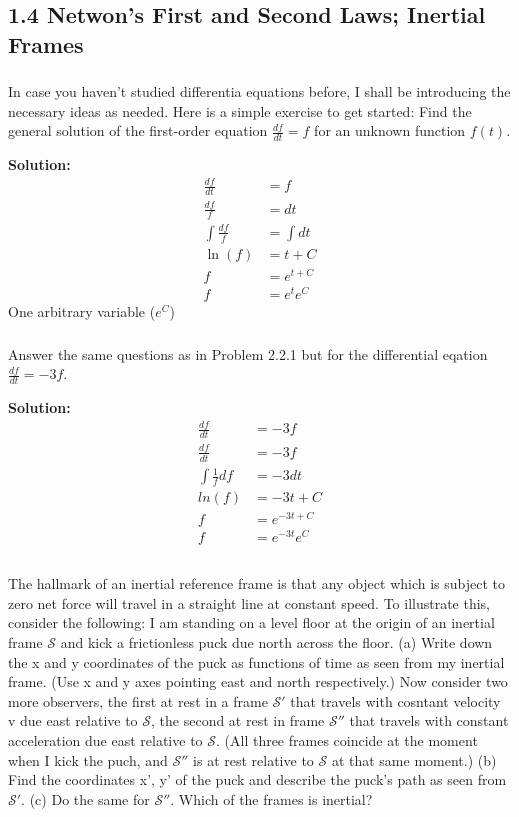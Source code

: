 \documentclass{article}
\newcounter{solution}
\newcommand\Problem{%
    \subsubsection{}%
}
\newcommand\TheSolution{%
  \textbf{Solution:}\\%
}
\begin{document}
\subsection{1.4 Netwon's First and Second Laws; Inertial Frames}
\Problem In case you haven't studied differentia equations before, I shall be introducing the necessary ideas as needed. Here is a simple exercise to get started: Find the general solution of the first-order equation $\frac{df}{dt} = f$ for an unknown function $f(t)$.

\TheSolution
\begin{equation}
    \begin{aligned}
        \frac{df}{dt}     & = f         \\
        \frac{df}{f}      & = dt        \\
        \int \frac{df}{f} & = \int dt   \\
        \ln(f)            & = t + C     \\
        f                 & = e^{t + C} \\
        f                 & = e^t e^C
    \end{aligned}
\end{equation}
One arbitrary variable ($e^C$)

\Problem Answer the same questions as in Problem 2.2.1 but for the differential eqation $\frac{df}{dt} = -3f$.

\TheSolution
\begin{equation}
    \begin{aligned}
        \frac{df}{dt}        & = -3f          \\
        \frac{df}{dt}        & = -3f          \\
        \int \frac{1}{f}  df & = -3 dt        \\
        ln(f)                & = -3t + C      \\
        f                    & = e^{-3t + C}  \\
        f                    & = e^{-3t}e^{C} \\
    \end{aligned}
\end{equation}

\Problem The hallmark of an inertial reference frame is that any object which is subject to zero net force will travel in a straight line at constant speed. To illustrate this, consider the following: I am standing on a level floor at the origin of an inertial frame $\mathcal{S}$ and kick a frictionless puck due north across the floor. (a) Write down the x and y coordinates of the puck as functions of time as seen from my inertial frame. (Use x and y axes pointing east and north respectively.) Now consider two more observers, the first at rest in a frame $\mathcal{S'}$ that travels with cosntant velocity v due east relative to $\mathcal{S}$, the second at rest in frame $\mathcal{S''}$ that travels with constant acceleration due east relative to $\mathcal{S}$. (All three frames coincide at the moment when I kick the puch, and $\mathcal{S''}$ is at rest relative to $\mathcal{S}$ at that same moment.) (b) Find the coordinates x', y' of the puck and describe the puck's path as seen from $\mathcal{S'}$. (c) Do the same for $\mathcal{S''}$. Which of the frames is inertial?
\end{document}
